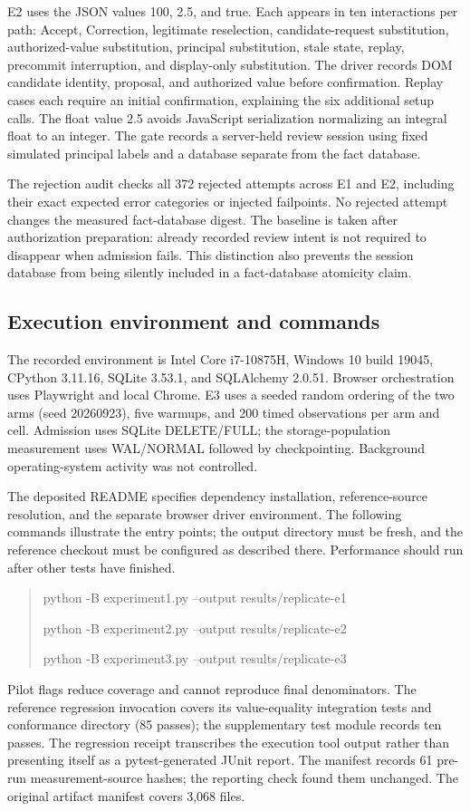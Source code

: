 \documentclass[preprint,12pt,authoryear]{elsarticle}
\begin{document}
E2 uses the JSON values 100, 2.5, and true. Each appears in ten interactions per path: Accept, Correction, legitimate reselection, candidate-request substitution, authorized-value substitution, principal substitution, stale state, replay, precommit interruption, and display-only substitution. The driver records DOM candidate identity, proposal, and authorized value before confirmation. Replay cases each require an initial confirmation, explaining the six additional setup calls. The float value 2.5 avoids JavaScript serialization normalizing an integral float to an integer. The gate records a server-held review session using fixed simulated principal labels and a database separate from the fact database.

The rejection audit checks all 372 rejected attempts across E1 and E2, including their exact expected error categories or injected failpoints. No rejected attempt changes the measured fact-database digest. The baseline is taken after authorization preparation: already recorded review intent is not required to disappear when admission fails. This distinction also prevents the session database from being silently included in a fact-database atomicity claim.

\subsection{Execution environment and commands}

The recorded environment is Intel Core i7-10875H, Windows 10 build 19045, CPython 3.11.16, SQLite 3.53.1, and SQLAlchemy 2.0.51. Browser orchestration uses Playwright and local Chrome. E3 uses a seeded random ordering of the two arms (seed 20260923), five warmups, and 200 timed observations per arm and cell. Admission uses SQLite DELETE/FULL; the storage-population measurement uses WAL/NORMAL followed by checkpointing. Background operating-system activity was not controlled.

The deposited README specifies dependency installation, reference-source resolution, and the separate browser driver environment. The following commands illustrate the entry points; the output directory must be fresh, and the reference checkout must be configured as described there. Performance should run after other tests have finished.
\begin{quote}\small\ttfamily
python -B experiment1.py --output results/replicate-e1\par
python -B experiment2.py --output results/replicate-e2\par
python -B experiment3.py --output results/replicate-e3
\end{quote}
Pilot flags reduce coverage and cannot reproduce final denominators. The reference regression invocation covers its value-equality integration tests and conformance directory (85 passes); the supplementary test module records ten passes. The regression receipt transcribes the execution tool output rather than presenting itself as a pytest-generated JUnit report. The manifest records 61 pre-run measurement-source hashes; the reporting check found them unchanged. The original artifact manifest covers 3,068 files.
\end{document}
